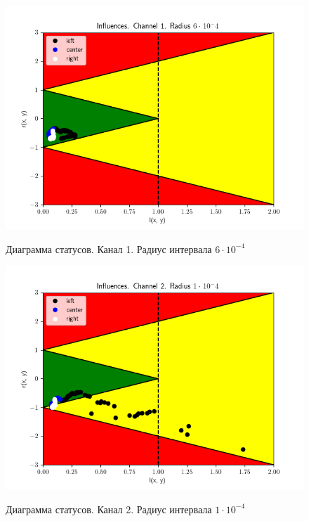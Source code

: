 \begin{figure}[H]
	\begin{center}
		\includegraphics[scale=0.83]{status_ch1_rad6}
		\label{pic:ch16}
		\caption{Диаграмма статусов. Канал 1. Радиус интервала $6 \cdot 10 ^ {-4}$}
	\end{center}
\end{figure}

\begin{figure}[H]
	\begin{center}
		\includegraphics[scale=0.83]{status_ch2_rad1}
		\label{pic:ch21}
		\caption{Диаграмма статусов. Канал 2. Радиус интервала $1 \cdot 10 ^ {-4}$}
	\end{center}
\end{figure}

